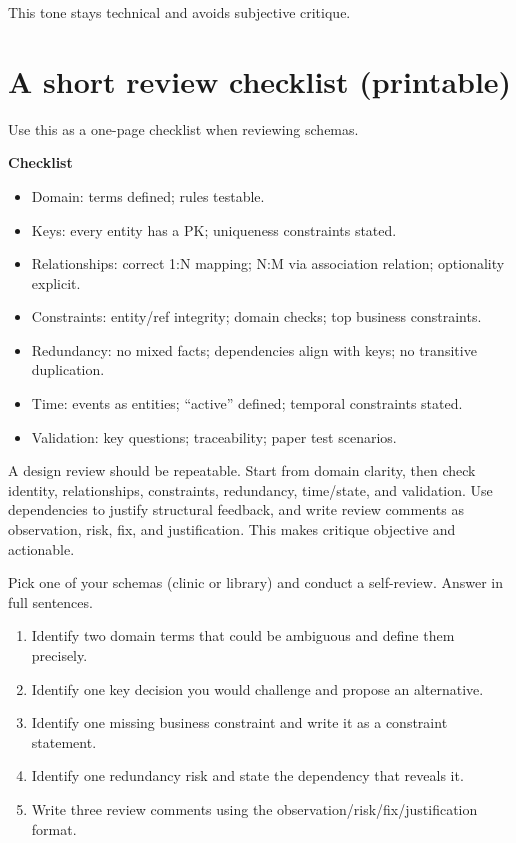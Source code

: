 This tone stays technical and avoids subjective critique.

\section{A short review checklist (printable)}
Use this as a one-page checklist when reviewing schemas.

\begin{examplebox}
\textbf{Checklist}\par\smallskip
\begin{itemize}
  \item Domain: terms defined; rules testable.
  \item Keys: every entity has a PK; uniqueness constraints stated.
  \item Relationships: correct 1:N mapping; N:M via association relation; optionality explicit.
  \item Constraints: entity/ref integrity; domain checks; top business constraints.
  \item Redundancy: no mixed facts; dependencies align with keys; no transitive duplication.
  \item Time: events as entities; “active” defined; temporal constraints stated.
  \item Validation: key questions; traceability; paper test scenarios.
\end{itemize}
\end{examplebox}

\begin{chaptersummary}
A design review should be repeatable.
Start from domain clarity, then check identity, relationships, constraints, redundancy, time/state, and validation.
Use dependencies to justify structural feedback, and write review comments as observation, risk, fix, and justification.
This makes critique objective and actionable.
\end{chaptersummary}

\begin{exercisebox}
Pick one of your schemas (clinic or library) and conduct a self-review.
Answer in full sentences.
\begin{enumerate}[label=\arabic*.]
  \item Identify two domain terms that could be ambiguous and define them precisely.
  \item Identify one key decision you would challenge and propose an alternative.
  \item Identify one missing business constraint and write it as a constraint statement.
  \item Identify one redundancy risk and state the dependency that reveals it.
  \item Write three review comments using the observation/risk/fix/justification format.
\end{enumerate}
\end{exercisebox}
